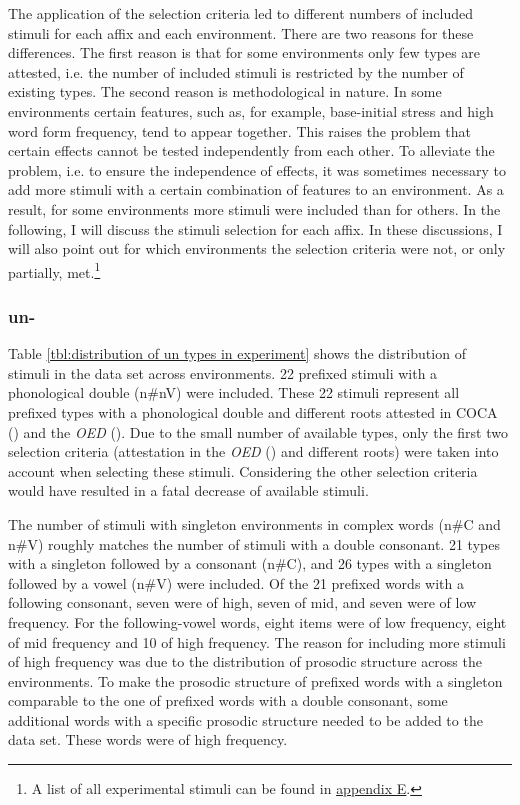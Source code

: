  

The application of the selection criteria led to different numbers of included stimuli for each affix and each environment. 
There are two reasons for these differences. The first reason is that for some environments only few types are attested, i.e. the number of included stimuli is restricted by the number of existing types. The second reason is methodological in nature. 
In some environments 
certain features, such as, for example, base-initial stress and high word form frequency, tend to appear together. This raises the problem that certain effects cannot be tested independently from each other. To alleviate the problem, i.e. to ensure the independence of effects, it was sometimes necessary to add more stimuli with a certain combination of features to an environment. As a result, for some environments more stimuli were included than for others. 
In the following, I will discuss the stimuli selection for each affix. In these discussions, I will also point out for which environments the selection criteria were not, or only partially, met.\footnote{A list of all experimental stimuli can be found in \hyperref[Appendix E: Stimuli of Experimental Study]{appendix E}.} 


\subsubsection{un-}

Table \ref{tbl:distribution of un types in experiment} shows the distribution of  stimuli in the data set across environments. 
22  prefixed stimuli with a phonological double ({n\#nV}) were included. These 22 stimuli represent all prefixed types with a phonological double and different roots attested in COCA (\citealt{Davies.20082014}) and the \textit{OED} (\citealt{OED.2013}). 
Due to the small number of available types, only the first two selection criteria (attestation in the \textit{OED} (\citealt{OED.2013}) and different roots) were taken into account when selecting these stimuli. Considering the other selection criteria would have resulted in a fatal decrease of available stimuli. 



The number of stimuli with singleton environments in complex words (n\#C and n\#V) roughly matches the number of stimuli with a double consonant. 21 types with a  singleton followed by a consonant ({n\#C}), and 26 types with a singleton followed by a vowel ({n\#V}) were included. 
Of the 21 prefixed words with a following consonant, seven were of high, seven of mid, and seven were of low frequency.
For the following-vowel words, eight items were of low frequency, eight of mid frequency and 10 of high frequency. The reason for including more stimuli of high frequency was due to the distribution of prosodic structure across the environments. To make the prosodic structure of prefixed words with a singleton comparable to the one of prefixed words with a double consonant, some additional words with a specific prosodic structure needed to be added to the data set. These words were of high frequency.




